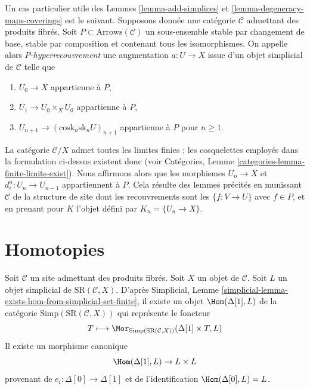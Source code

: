 \begin{remark}
\label{remark-P-covering}
Un cas particulier utile des Lemmes \ref{lemma-add-simplices} et
\ref{lemma-degeneracy-maps-coverings} est le suivant.
Supposons donnée une catégorie $\mathcal{C}$ admettant des produits fibrés.
Soit $P \subset \text{Arrows}(\mathcal{C})$ un sous-ensemble
stable par changement de base, stable par composition
et contenant tous les isomorphismes. On appelle alors
{\it $P$-hyperrecouvrement} une augmentation $a : U \to X$
issue d'un objet simplicial de $\mathcal{C}$ telle que
\begin{enumerate}
\item $U_0 \to X$ appartienne à $P$,
\item $U_1 \to U_0 \times_X U_0$ appartienne à $P$,
\item $U_{n + 1} \to (\text{cosk}_n\text{sk}_n U)_{n + 1}$
appartienne à $P$ pour $n \geq 1$.
\end{enumerate}
La catégorie $\mathcal{C}/X$ admet toutes les limites finies ; les
cosquelettes employés dans la formulation ci-dessus existent donc
(voir Catégories, Lemme \ref{categories-lemma-finite-limits-exist}).
Nous affirmons alors que les morphismes $U_n \to X$ et $d^n_i : U_n \to U_{n - 1}$
appartiennent à $P$. Cela résulte des lemmes précités
en munissant $\mathcal{C}$ de la structure de site dont les recouvrements
sont les $\{f : V \to U\}$ avec $f \in P$, et en prenant pour $K$ l'objet défini par
$K_n = \{U_n \to X\}$.
\end{remark}


\section{Homotopies}
\label{section-homotopies}

\noindent
Soit $\mathcal{C}$ un site admettant des produits fibrés.
Soit $X$ un objet de $\mathcal{C}$.
Soit $L$ un objet simplicial de $\text{SR}(\mathcal{C}, X)$.
D'après
Simplicial, Lemme \ref{simplicial-lemma-exists-hom-from-simplicial-set-finite},
il existe un objet $\Hom(\Delta[1], L)$
de la catégorie $\text{Simp}(\text{SR}(\mathcal{C}, X))$ qui représente le
foncteur
$$
T
\longmapsto
\Mor_{\text{Simp}(\text{SR}(\mathcal{C}, X))}(\Delta[1] \times T, L)
$$
Il existe un morphisme canonique
$$
\Hom(\Delta[1], L) \to L \times L
$$
provenant de $e_i : \Delta[0] \to \Delta[1]$ et de l'identification
$\Hom(\Delta[0], L) = L$.

